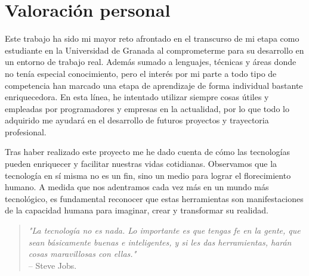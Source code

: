  \section{Valoración personal}

 Este trabajo ha sido mi mayor reto afrontado en el transcurso de mi etapa como estudiante en la Universidad de Granada al comprometerme para su desarrollo en un entorno de trabajo real. Además sumado a lenguajes, técnicas y áreas donde no tenía especial conocimiento, pero el interés por mi parte a todo tipo de competencia han marcado una etapa de aprendizaje de forma individual bastante enriquecedora. En esta línea, he intentado utilizar siempre cosas útiles y empleadas por programadores y empresas en la actualidad, por lo que todo lo adquirido me ayudará en el desarrollo de futuros proyectos y trayectoria profesional.

 Tras haber realizado este proyecto me he dado cuenta de cómo las tecnologías pueden enriquecer y facilitar nuestras vidas cotidianas. Observamos que la tecnología en sí misma no es un fin, sino un medio para lograr el florecimiento humano. A medida que nos adentramos cada vez más en un mundo más tecnológico, es fundamental reconocer que estas herramientas son manifestaciones de la capacidad humana para imaginar, crear y transformar su realidad. 

\begin{quote}
    \textit{"La tecnología no es nada. Lo importante es que tengas fe en la gente, que sean básicamente buenas e inteligentes, y si les das herramientas, harán cosas maravillosas con ellas."} \\ 
    -- Steve Jobs.
\end{quote}
